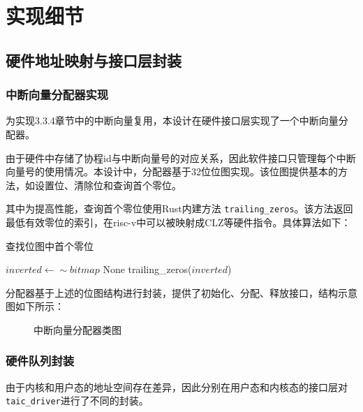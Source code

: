 \chapter{实现细节}


\section{硬件地址映射与接口层封装}

\subsection{中断向量分配器实现}

为实现3.3.4章节中的中断向量复用，本设计在硬件接口层实现了一个中断向量分配器。

由于硬件中存储了协程id与中断向量号的对应关系，因此软件接口只管理每个中断向量号的使用情况。本设计中，分配器基于32位位图实现。该位图提供基本的方法，如设置位、清除位和查询首个零位。

其中为提高性能，查询首个零位使用Rust内建方法 \verb|trailing_zeros|。该方法返回最低有效零位的索引，在risc-v中可以被映射成CLZ等硬件指令。具体算法如下：


\begin{algorithm}
  \caption{查找位图中首个零位}
  \label{alg:find_first_unset}
  \begin{algorithmic}
    \State $inverted \gets \sim bitmap$
    \State \Return None
    \Else
    \State \Return trailing\_zeros($\textit{inverted}$)
    \EndIf
    \EndFunction
  \end{algorithmic}
\end{algorithm}

分配器基于上述的位图结构进行封装，提供了初始化、分配、释放接口，结构示意图如下所示：

\begin{figure}[htbp]
  \centering
  
  \caption{中断向量分配器类图}\label{中断向量分配器类图}
\end{figure}


\subsection{硬件队列封装}

由于内核和用户态的地址空间存在差异，因此分别在用户态和内核态的接口层对\texttt{taic\_driver}进行了不同的封装。

